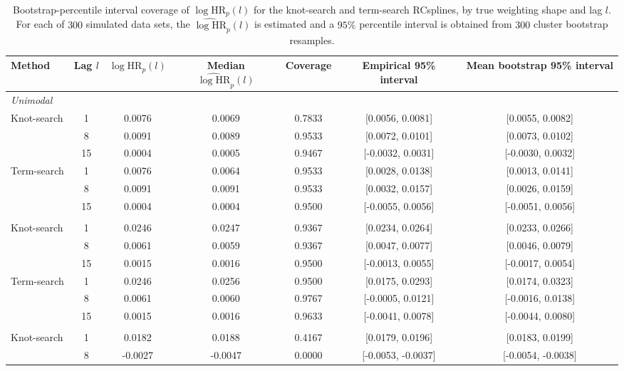 \documentclass{article}
\begin{document}
\begin{table}[ht]
\centering
\caption{Bootstrap-percentile interval coverage of $\log\mathrm{HR}_p(l)$ for the knot-search and term-search RCsplines, by true weighting shape and lag $l$. For each of $300$ simulated data sets, the $\widehat{\log\mathrm{HR}}_p(l)$ is estimated and a $95\%$ percentile interval is obtained from $300$ cluster bootstrap resamples.}
\label{tab:coverage}
\begin{tabular}{l c c c c c c}
\toprule
Method & Lag $l$ & $\log\mathrm{HR}_p(l)$ & Median $\widehat{\log\mathrm{HR}}_p(l)$ & Coverage & Empirical 95\% interval & Mean bootstrap 95\% interval \\
\midrule
\multicolumn{7}{l}{\emph{Unimodal}}\\
Knot-search & 1 & 0.0076 & 0.0069 & 0.7833 & [0.0056, 0.0081] & [0.0055, 0.0082] \\
 & 8 & 0.0091 & 0.0089 & 0.9533 & [0.0072, 0.0101] & [0.0073, 0.0102] \\
 & 15 & 0.0004 & 0.0005 & 0.9467 & [-0.0032, 0.0031] & [-0.0030, 0.0032] \\
Term-search & 1 & 0.0076 & 0.0064 & 0.9533 & [0.0028, 0.0138] & [0.0013, 0.0141] \\
 & 8 & 0.0091 & 0.0091 & 0.9533 & [0.0032, 0.0157] & [0.0026, 0.0159] \\
 & 15 & 0.0004 & 0.0004 & 0.9500 & [-0.0055, 0.0056] & [-0.0051, 0.0056] \\
\addlinespace
\multicolumn{7}{l}{\emph{Damped exponential}}\\
Knot-search & 1 & 0.0246 & 0.0247 & 0.9367 & [0.0234, 0.0264] & [0.0233, 0.0266] \\
 & 8 & 0.0061 & 0.0059 & 0.9367 & [0.0047, 0.0077] & [0.0046, 0.0079] \\
 & 15 & 0.0015 & 0.0016 & 0.9500 & [-0.0013, 0.0055] & [-0.0017, 0.0054] \\
Term-search & 1 & 0.0246 & 0.0256 & 0.9500 & [0.0175, 0.0293] & [0.0174, 0.0323] \\
 & 8 & 0.0061 & 0.0060 & 0.9767 & [-0.0005, 0.0121] & [-0.0016, 0.0138] \\
 & 15 & 0.0015 & 0.0016 & 0.9633 & [-0.0041, 0.0078] & [-0.0044, 0.0080] \\
\addlinespace
\multicolumn{7}{l}{\emph{Bimodal 1}}\\
Knot-search & 1 & 0.0182 & 0.0188 & 0.4167 & [0.0179, 0.0196] & [0.0183, 0.0199] \\
 & 8 & -0.0027 & -0.0047 & 0.0000 & [-0.0053, -0.0037] & [-0.0054, -0.0038] \\

\end{tabular}
\end{table}
\end{document}
